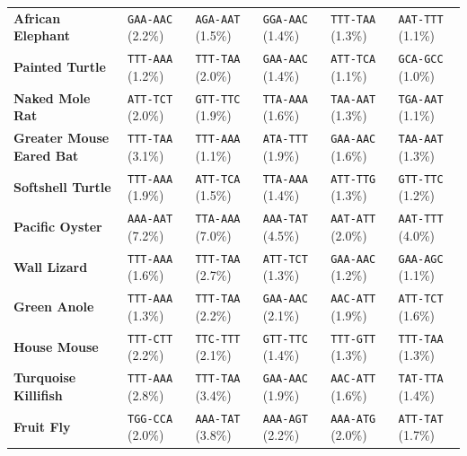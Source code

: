 \documentclass[11pt,a4paper]{article}
\renewcommand{\_}{\origunderscore\penalty200\relax}
\theoremstyle{remark}
\begin{document}
\begin{table}[H]
{\begin{tabular}{llllll}
\textbf{African Elephant} & \texttt{GAA-AAC} (2.2\%) & \texttt{AGA-AAT} (1.5\%) & \texttt{GGA-AAC} (1.4\%) & \texttt{TTT-TAA} (1.3\%) & \texttt{AAT-TTT} (1.1\%) \\
\textbf{Painted Turtle} & \texttt{TTT-AAA} (1.2\%) & \texttt{TTT-TAA} (2.0\%) & \texttt{GAA-AAC} (1.4\%) & \texttt{ATT-TCA} (1.1\%) & \texttt{GCA-GCC} (1.0\%) \\
\textbf{Naked Mole Rat} & \texttt{ATT-TCT} (2.0\%) & \texttt{GTT-TTC} (1.9\%) & \texttt{TTA-AAA} (1.6\%) & \texttt{TAA-AAT} (1.3\%) & \texttt{TGA-AAT} (1.1\%) \\
\textbf{Greater Mouse Eared Bat} & \texttt{TTT-TAA} (3.1\%) & \texttt{TTT-AAA} (1.1\%) & \texttt{ATA-TTT} (1.9\%) & \texttt{GAA-AAC} (1.6\%) & \texttt{TAA-AAT} (1.3\%) \\
\textbf{Softshell Turtle} & \texttt{TTT-AAA} (1.9\%) & \texttt{ATT-TCA} (1.5\%) & \texttt{TTA-AAA} (1.4\%) & \texttt{ATT-TTG} (1.3\%) & \texttt{GTT-TTC} (1.2\%) \\
\textbf{Pacific Oyster} & \texttt{AAA-AAT} (7.2\%) & \texttt{TTA-AAA} (7.0\%) & \texttt{AAA-TAT} (4.5\%) & \texttt{AAT-ATT} (2.0\%) & \texttt{AAT-TTT} (4.0\%) \\
\textbf{Wall Lizard} & \texttt{TTT-AAA} (1.6\%) & \texttt{TTT-TAA} (2.7\%) & \texttt{ATT-TCT} (1.3\%) & \texttt{GAA-AAC} (1.2\%) & \texttt{GAA-AGC} (1.1\%) \\
\textbf{Green Anole} & \texttt{TTT-AAA} (1.3\%) & \texttt{TTT-TAA} (2.2\%) & \texttt{GAA-AAC} (2.1\%) & \texttt{AAC-ATT} (1.9\%) & \texttt{ATT-TCT} (1.6\%) \\
\textbf{House Mouse} & \texttt{TTT-CTT} (2.2\%) & \texttt{TTC-TTT} (2.1\%) & \texttt{GTT-TTC} (1.4\%) & \texttt{TTT-GTT} (1.3\%) & \texttt{TTT-TAA} (1.3\%) \\
\textbf{Turquoise Killifish} & \texttt{TTT-AAA} (2.8\%) & \texttt{TTT-TAA} (3.4\%) & \texttt{GAA-AAC} (1.9\%) & \texttt{AAC-ATT} (1.6\%) & \texttt{TAT-TTA} (1.4\%) \\
\textbf{Fruit Fly} & \texttt{TGG-CCA} (2.0\%) & \texttt{AAA-TAT} (3.8\%) & \texttt{AAA-AGT} (2.2\%) & \texttt{AAA-ATG} (2.0\%) & \texttt{ATT-TAT} (1.7\%) \\
\bottomrule
\end{tabular}}
\end{table}
\end{document}
